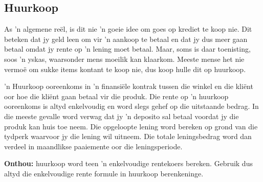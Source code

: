 \subsection{Huurkoop}

As 'n algemene re\"el, is dit nie 'n goeie idee om goes op krediet te koop nie. Dit beteken dat jy geld leen om vir 'n aankoop te betaal en dat jy dus meer gaan betaal omdat jy rente op 'n lening moet betaal. Maar, soms is daar toenisting, soos 'n yskas, waarsonder mens moeilik kan klaarkom. Meeste mense het nie vermo\"e om sukke items kontant te koop nie, dus koop hulle dit op huurkoop.\par

'n Huurkoop ooreenkoms in 'n finansi\"ele kontrak tussen die winkel en die kli\"ent oor hoe die kli\"ent gaan betaal vir die produk. Die rente op 'n huurkoop ooreenkoms is altyd enkelvoudig en word slegs gehef op die uitstaande bedrag. In die meeste gevalle word verwag dat jy 'n deposito sal betaal voordat jy die produk kan huis toe neem. Die opgeloopte lening word bereken op grond van die tydperk waarvoor jy die lening wil uitneem. Die totale leningsbedrag word dan verdeel in maandlikse paaiemente oor die leningsperiode.

\par
\textbf{Onthou:} huurkoop word teen 'n enkelvoudige rentekoers bereken. Gebruik dus altyd die enkelvoudige rente formule in huurkoop berenkeninge.

